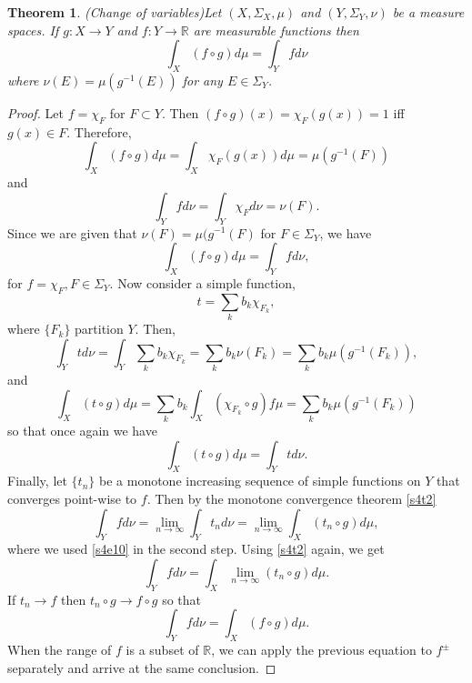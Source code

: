 \documentclass{article}
\newcommand{\sor}{\mathbb{R}}
\theoremstyle{plain}
\newtheorem{thm}{Theorem}
\numberwithin{thm}{section}
\theoremstyle{plain}
\numberwithin{prop}{section}
\theoremstyle{definition}
\numberwithin{defn}{section}
\theoremstyle{remark}
\theoremstyle{plain}
\numberwithin{cor}{section}
\numberwithin{equation}{section}
\begin{document}
\begin{thm}(Change of variables)\label{s4t7}
Let $(X, \Sigma_X, \mu)$ and $(Y, \Sigma_Y, \nu)$ be a measure spaces. If $g:X
\rightarrow Y$ and $f: Y \rightarrow \sor$ are measurable functions then
\[
\int_X (f \circ g)d\mu = \int_Y fd\nu
\]
where $\nu(E) = \mu(g^{-1}(E))$ for any $E \in \Sigma_Y$.
\end{thm}
\begin{proof}
Let $f = \chi_F$ for $F \subset Y$. Then $(f \circ g)(x) = \chi_F(g(x)) = 1$ iff
$g(x) \in F$. Therefore,
\begin{equation}\label{s4e5}
\int_X (f \circ g) d\mu = \int_X \chi_F(g(x))d\mu = \mu(g^{-1}(F))
\end{equation}
and
\begin{equation}\label{s4e6}
\int_Y fd\nu = \int_Y\chi_F d\nu = \nu(F).
\end{equation}
Since we are given that $\nu(F) = \mu(g^{-1}(F)$ for $F \in \Sigma_Y$, we have
\begin{equation}\label{s4e7}
\int_X (f \circ g) d\mu = \int_Y fd\nu,
\end{equation}
for $f = \chi_F, F \in \Sigma_Y$. Now consider a simple function,
\[
t = \sum_{k}b_k\chi_{F_k},
\]
where $\{F_k\}$ partition $Y$. Then,
\begin{equation}\label{s4e8}
\int_Y td\nu = \int_Y \sum_k b_k \chi_{F_k} = \sum_k b_k \nu(F_k) = 
\sum_k b_k\mu(g^{-1}(F_k)),
\end{equation}
and
\begin{equation}\label{s4e9}
\int_X (t \circ g)d\mu = \sum_k b_k\int_X (\chi_{F_k} \circ g)f\mu = 
\sum_k b_k\mu(g^{-1}(F_k))
\end{equation}
so that once again we have
\begin{equation}\label{s4e10}
\int_X (t \circ g) d\mu = \int_Y td\nu.
\end{equation}
Finally, let $\{t_n\}$ be a monotone increasing sequence of simple functions
on $Y$ that converges point-wise to $f$. Then by the monotone convergence
theorem \ref{s4t2}
\[
\int_Y fd\nu = \lim_{n \rightarrow \infty}\int_Y t_n d\nu = 
\lim_{n \rightarrow \infty}\int_X (t_n \circ g)d\mu,
\]
where we used \eqref{s4e10} in the second step. Using \ref{s4t2} again, we get
\[
\int_Y fd\nu = \int_X\lim_{n \rightarrow \infty}(t_n \circ g)d\mu.
\]
If $t_n \rightarrow f$ then $t_n \circ g \rightarrow f \circ g$ so that
\[
\int_Y fd\nu = \int_X (f \circ g)d\mu.
\]
When the range of $f$ is a subset of $\sor$, we can apply the previous equation
to $f^{\pm}$ separately and arrive at the same conclusion.
\end{proof}
\end{document}
